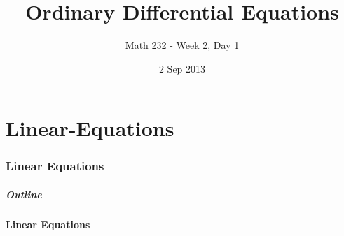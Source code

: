 \part{Linear-Equations}
\section{Linear Equations}


\title{Ordinary Differential Equations}
\subtitle{Math 232 - Week 2, Day 1}
\date{2 Sep 2013}

\begin{frame}
  \titlepage
\end{frame}

\begin{frame}
  \frametitle{Outline}
  \tableofcontents[hideothersubsections]
\end{frame}


\subsection{Linear Equations}


